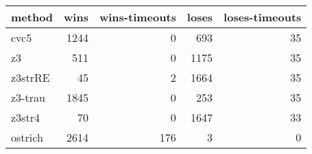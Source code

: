 \begin{tabular}{lrrrr}
\hline
 method   &   wins &   wins-timeouts &   loses &   loses-timeouts \\
\hline
 cvc5     &   1244 &               0 &     693 &               35 \\
 z3       &    511 &               0 &    1175 &               35 \\
 z3strRE  &     45 &               2 &    1664 &               35 \\
 z3-trau  &   1845 &               0 &     253 &               35 \\
 z3str4   &     70 &               0 &    1647 &               33 \\
 ostrich  &   2614 &             176 &       3 &                0 \\
\hline
\end{tabular}
